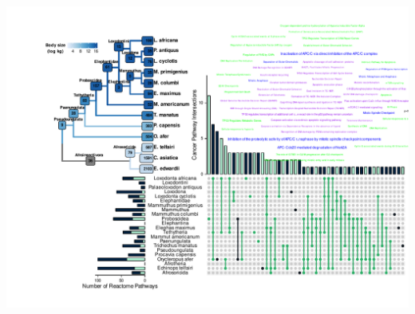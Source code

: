 \documentclass[]{elsarticle} %
\let\origfigure\figure
\let\endorigfigure\endfigure
\renewenvironment{figure}[1][2] {
    \expandafter\origfigure\expandafter[H]
} {
    \endorigfigure
}
\begin{document}
\begin{figure}[H]
\includegraphics[width=6in,]{paper_PLOS_draft_files/figure-latex/Figure-ML-UpSet-WC-1} \caption{While duplications of genes in tumor supressor pathways are pervasive in \emph{Atlantogenata}, \emph{Proboscideans} have a greater number of cancer-related pathways enriched, in addition to duplications in various unique pathways. \textbf{A)} A cladogram of \emph{Afrotheria} highlighting the estimated number of genes duplicated at each node using maximum likelihood. \textbf{B)} Upset plot of cancer-related Reactome pathways enriched in each clade in \textbf{A}. \textbf{C)} Wordcloud of enriched pathways among Proboscideans that are exclusive to Proboscidea (purple), shared between Proboscidea and Tethytheria (blue), or shared between Proboscidea and one or more other lineages (green).}\label{fig:Figure-ML-UpSet-WC}
\end{figure}
\end{document}
